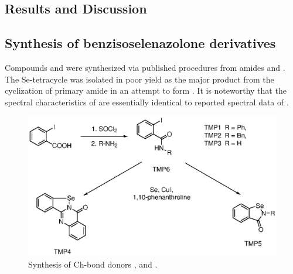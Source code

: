 \begin{refsection}
\section{Results and Discussion}
\subsection[Synthesis of \refcmpd{ebs,ebs.bn,tetracycle}]{Synthesis of benzisoselenazolone derivatives }
Compounds  and  were synthesized via published procedures from amides  and .\autocite{Bhabak2010}
The Se-tetracycle  was isolated in poor yield as the major product from the cyclization of primary amide  in an attempt to form .
It is noteworthy that the spectral characteristics of  are essentially identical to reported spectral data of \autocite{Bhabak2010}.

\begin{figure}
  \centering
  \includegraphics[scale=0.74]{Figures/catalytic-synthesis.eps}
  \caption{Synthesis of Ch-bond donors ,  and .}
  \label{fig:synthesis}
\end{figure}


\end{refsection}
